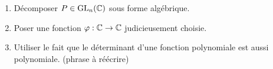 \begin{enumerate}
    \item Décomposer $P \in \mathrm{GL}_n(\mathbb{C})$ sous forme algébrique.
    \item Poser une fonction $\varphi: \mathbb{C} \rightarrow \mathbb{C}$ judicieusement choisie.
    \item Utiliser le fait que le déterminant d'une fonction polynomiale est aussi polynomiale. (phrase à réécrire)
\end{enumerate}